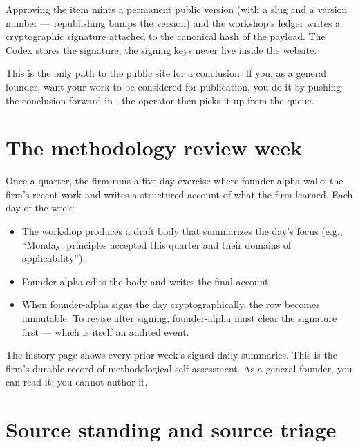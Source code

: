 \documentclass[11pt]{article}
\begin{document}
Approving the item mints a permanent public version (with a slug and
a version number --- republishing bumps the version) and the
workshop's ledger writes a cryptographic signature attached to the
canonical hash of the payload. The Codex stores the signature; the
signing keys never live inside the website.


This is the only path to the public site for a conclusion. If you, as
a general founder, want your work to be considered for publication,
you do it by pushing the conclusion forward in ; the
operator then picks it up from the queue.

\section{The methodology review week}

Once a quarter, the firm runs a five-day exercise where founder-alpha
walks the firm's recent work and writes a structured account of what
the firm learned. Each day of the week:

\begin{itemize}[leftmargin=*,itemsep=0.2em]
  \item The workshop produces a draft body that summarizes the day's
        focus (e.g., ``Monday: principles accepted this quarter and
        their domains of applicability'').
  \item Founder-alpha edits the body and writes the final account.
  \item When founder-alpha signs the day cryptographically, the row
        becomes immutable. To revise after signing, founder-alpha
        must clear the signature first --- which is itself an audited
        event.
\end{itemize}

The history page shows every prior week's signed daily summaries.
This is the firm's durable record of methodological self-assessment.
As a general founder, you can read it; you cannot author it.

\section{Source standing and source triage}
\end{document}
